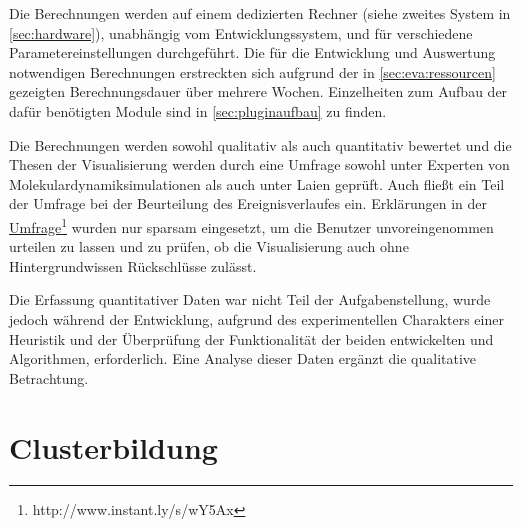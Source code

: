 Die Berechnungen werden auf einem dedizierten Rechner (siehe zweites System in \autoref{sec:hardware}), unabhängig vom Entwicklungssystem, und für verschiedene Parametereinstellungen durchgeführt. Die für die Entwicklung und Auswertung notwendigen Berechnungen erstreckten sich aufgrund der in \autoref{sec:eva:ressourcen} gezeigten Berechnungsdauer über mehrere Wochen. Einzelheiten zum Aufbau der dafür benötigten Module sind in \autoref{sec:pluginaufbau} zu finden.

Die Berechnungen werden sowohl qualitativ als auch quantitativ bewertet und die Thesen der Visualisierung werden durch eine Umfrage sowohl unter Experten von Molekulardynamiksimulationen als auch unter Laien geprüft. Auch fließt ein Teil der Umfrage bei der Beurteilung des Ereignisverlaufes ein. Erklärungen in der \href{http://www.instant.ly/s/wY5Ax}{Umfrage}\footnote{http://www.instant.ly/s/wY5Ax} wurden nur sparsam eingesetzt, um die Benutzer unvoreingenommen urteilen zu lassen und zu prüfen, ob die Visualisierung auch ohne Hintergrundwissen Rückschlüsse zulässt.

Die Erfassung quantitativer Daten war nicht Teil der Aufgabenstellung, wurde jedoch während der Entwicklung, aufgrund des experimentellen Charakters einer Heuristik und der Überprüfung der Funktionalität der beiden entwickelten \CFD und \SECC Algorithmen, erforderlich. Eine Analyse dieser Daten ergänzt die qualitative Betrachtung.

\section{Clusterbildung}\label{sec:eva:cluster}

